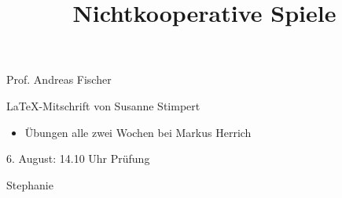 \documentclass[a4paper, fleqn]{scrartcl}
\title{Nichtkooperative Spiele}
\begin{document}
\maketitle
\begin{center}
  Prof. Andreas Fischer
  
  \LaTeX-Mitschrift von Susanne Stimpert
\end{center}

\begin{itemize}
\item Übungen alle zwei Wochen bei Markus Herrich
\end{itemize}




6. August: 14.10 Uhr Prüfung

Stephanie
\end{document}
